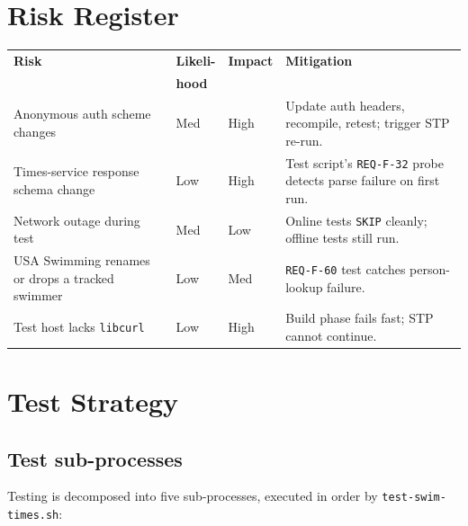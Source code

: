 \documentclass[12pt]{article}
\newcommand{\code}[1]{\texttt{#1}}
\newcommand{\req}[1]{\texttt{#1}}
\begin{document}
\section{Risk Register}

\begin{center}
\begin{longtable}{p{4.0cm}p{1.5cm}p{1.5cm}p{6cm}}
  \toprule
  \textbf{Risk} & \textbf{Likeli-} & \textbf{Impact} & \textbf{Mitigation} \\
                & \textbf{hood}     &                  & \\
  \midrule\endhead
  Anonymous auth scheme changes
            & Med  & High & Update auth headers, recompile, retest;
                            trigger STP re-run. \\
  Times-service response schema change
            & Low  & High & Test script's \req{REQ-F-32} probe
                            detects parse failure on first run. \\
  Network outage during test
            & Med  & Low  & Online tests \texttt{SKIP} cleanly;
                            offline tests still run. \\
  USA Swimming renames or drops a tracked swimmer
            & Low  & Med  & \req{REQ-F-60} test catches
                            person-lookup failure. \\
  Test host lacks \code{libcurl}
            & Low  & High & Build phase fails fast; STP cannot
                            continue. \\
  \bottomrule
\end{longtable}
\end{center}

\section{Test Strategy}

\subsection{Test sub-processes}

Testing is decomposed into five sub-processes, executed in order
by \code{test-swim-times.sh}:
\end{document}
